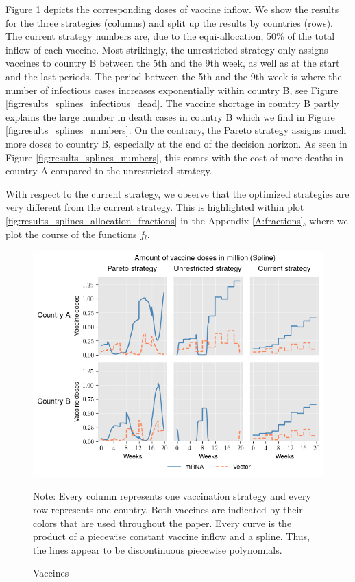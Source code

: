 Figure \ref{fig:results_splines_allocation} depicts the corresponding doses of vaccine inflow. We show the results for the three strategies (columns) and split up the results by countries (rows). The current strategy numbers are, due to the equi-allocation, 50\% of the total inflow of each vaccine. Most strikingly, the unrestricted strategy only assigns vaccines to country B between the 5th and the 9th week, as well as at the start and the last periods. The period between the 5th and the 9th week is where the number of infectious cases increases exponentially within country B, see Figure \ref{fig:results_splines_infectious_dead}.
The vaccine shortage in country B partly explains the large number in death cases in country B which we find in Figure \ref{fig:results_splines_numbers}. On the contrary, the Pareto strategy assigns much more doses to country B, especially at the end of the decision horizon. As seen in Figure \ref{fig:results_splines_numbers}, this comes with the cost of more deaths in country A compared to the unrestricted strategy.

With respect to the current strategy, we observe that the optimized strategies are very different from the current strategy. This is highlighted within plot \ref{fig:results_splines_allocation_fractions} in the Appendix \ref{A:fractions}, where we plot the course of the functions $f_l$. 
\begin{figure}[h!]
\centering
\includegraphics[scale=0.85]{images/splines_vaccine_total_quantity.png}\\
\begin{flushleft}
\scriptsize{Note:} Every column represents one vaccination strategy and every row represents one country. Both vaccines are indicated by their colors that are used throughout the paper. 
Every curve is the product of a piecewise constant vaccine inflow and a spline. Thus, the lines appear to be discontinuous piecewise polynomials. 
\end{flushleft}
\caption{Vaccines}
\label{fig:results_splines_allocation}
\end{figure}

